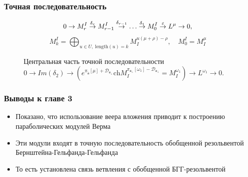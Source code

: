 \documentclass[pdftex]{beamer}
\newcommand{\afb}{\mathfrak{a}_{\bot}}
\newcommand{\aft}{\widetilde{\mathfrak{a}}}
\theoremstyle{definition} \newtheorem{Def}{Определение}
\begin{document}
\begin{frame}
  \frametitle{Точная последовательность}
  \begin{equation*}
    0\rightarrow M_{r}^{I}\overset{\delta _{r}}{\rightarrow }M_{r-1}^{I}\overset{%
      \delta _{r-1}}{\rightarrow }\ldots \overset{\delta _{1}}{\rightarrow }%
    M_{0}^{I}\overset{\varepsilon }{\rightarrow }L^{\mu }\rightarrow 0,
  \end{equation*}
  \begin{equation*}
    M_{k}^{I}=\bigoplus_{u\in U,\;\mathrm{length}\left( u\right)
      =k}M_{I}^{u\left( \mu +\rho \right) -\rho },\quad M_{0}^{I}=M_{I}^{\mu }
  \end{equation*}
  \vspace{-0.5cm}
  \begin{figure}[h!bt]
    \noindent{}
\vspace{-0.5cm}
    \caption{
      Центральная часть точной последовательности
      $0 \to Im(\delta_2) \to \left( e^{\pi _{\aft}\left[ \mu \right] + \mathcal{D}_{\afb}}\mathrm{ch}M_{I}^{\pi _{\afb}\left[ \omega_1 \right] -
          \mathcal{D}_{\afb} }=M^{\omega_1}_{I}\right) \to
      L^{\omega_1}\to 0 $.  
    }
  \end{figure}
\end{frame}
\begin{frame}
  \frametitle{Выводы к главе 3}
  \begin{itemize}
  \item Показано, что использование веера вложения приводит к построению параболических модулей Верма
  \item Эти модули входят в точную последовательность обобщенной резольвентой Бернштейна-Гельфанда-Гельфанда
  \item То есть установлена связь ветвления с обобщенной БГГ-резольвентой
  \end{itemize}
\end{frame}
\end{document}
